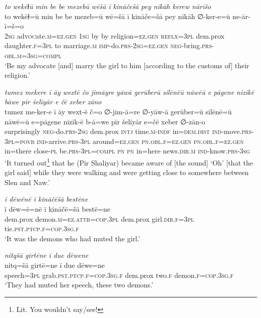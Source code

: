 \ea \label{ŽP.165}
\textit{to wekēɫū min be be mezebū wēšā ī kināčešā pey nīkāh kerew nārīšo} \\ 
\gll to wekēɫ=ū min be be mezeb=ū wē=šā ī kināče=šā pey nīkāh ∅-ker-e=ū ne-ār-ī=š=o \\ 
 \textsc{2sg} ad\textsc{voc}ate\textsc{.m}\textsc{\textsc{=ez.gen}} \textsc{1sg} by by religion\textsc{\textsc{=ez.gen}} \textsc{reflx}\textsc{=3pl} dem.prox daughter\textsc{.f}\textsc{=3pl} to marriage\textsc{.m} \textsc{imp-}do\textsc{.prs}-\textsc{2sg}\textsc{\textsc{=ez.gen}} \textsc{neg-}bring\textsc{.prs}\textsc{-obl}\textsc{.m}\textsc{=3sg}\textsc{=compl} \\ 
\glt `Be my advocate [and] marry the girl to him [according to the customs of] their religion.'
\z 
 
\ea \label{ŽP.175}
\textit{tumez mekere ī āy wextē čo jimāyre yāwā gerūberū silēnēū nāwēū e pāgene nizīkē bāwe pīr šelīyār e čē xeber zāno} \\ 
\gll tumez me-ker-e ī āy wext-ē č=o ∅-jim-ā=re ∅-yāw-ā gerūber=ū silēnē=ū nāwē=ū e=pāgene nizīk-ē b-ā=we pīr šelīyār e=čē xeber ∅-zān-o \\ 
 surprisingly \textsc{neg-}do\textsc{.prs}-\textsc{2sg} dem.prox \textsc{intj} time\textsc{.m}\textsc{-indf} in=\textsc{dem.dist} \textsc{ind-}move\textsc{.prs}\textsc{-3pl}\textsc{=\textsc{povb}} \textsc{ind-}arrive\textsc{.prs}\textsc{-3pl} around\textsc{\textsc{=ez.gen}} \textsc{pn}\textsc{.obl}\textsc{.f}\textsc{\textsc{=ez.gen}} \textsc{pn}\textsc{.obl}\textsc{.f}\textsc{\textsc{=ez.gen}} in=there close\textsc{\textsc{-pl}} be\textsc{.prs}\textsc{-3pl}\textsc{=compl} \textsc{pn} \textsc{pn} in=here news\textsc{.dir}\textsc{.m} \textsc{ind-}know\textsc{.prs}\textsc{-3sg} \\ 
\glt `It turned out\footnote{Lit. You wouldn’t say/see!} that he (Pir Shaliyar) became aware of [the sound] ‘Oh’ [that the girl said] while they were walking and were getting close to somewhere between Slen and Naw.'
\z 
 
\ea \label{ŽP.177}
\textit{ī dēwēnē ī kināčēšā bestēne} \\ 
\gll ī dēw=ē=nē ī kināčē=šā bestē=ne \\ 
 dem.prox demon\textsc{.m}\textsc{=ez}.\textsc{attr}\textsc{=cop}\textsc{.3pl} dem.prox girl\textsc{.dir}\textsc{.f}\textsc{=3pl} tie\textsc{.pst}\textsc{.ptcp}\textsc{.f}\textsc{=cop}\textsc{.3sg}\textsc{.f} \\ 
\glt `It was the demons who had muted the girl.'
\z 
 
\ea \label{ŽP.178}
\textit{nitqšā girtēne ī due dēwene} \\ 
\gll nitq=šā girtē=ne ī due dēwe=ne \\ 
 speech\textsc{=3pl} grab\textsc{.pst}\textsc{.ptcp}\textsc{.f}\textsc{=cop}\textsc{.3sg}\textsc{.f} dem.prox two\textsc{.f} demon\textsc{.f}\textsc{=cop}\textsc{.3sg}\textsc{.f} \\ 
\glt `They had muted her speech, these two demons.'
\z 
 
